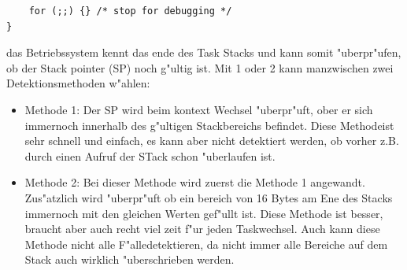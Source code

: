 \documentclass[a4paper, 8pt]{extarticle}
\begin{document}
\begin{multicols*}{3}
\begin{description}
\begin{lstlisting}
	for (;;) {} /* stop for debugging */
}
						\end{lstlisting} 
						das Betriebssystem kennt das ende des Task Stacks und kann somit "uberpr"ufen, ob der Stack pointer (SP) noch g"ultig ist.
						Mit 1 oder 2 kann manzwischen zwei Detektionsmethoden w"ahlen:
						\begin{itemize}
							\item Methode 1:
								  Der SP wird beim kontext Wechsel "uberpr"uft, ober er sich immernoch innerhalb des g"ultigen Stackbereichs befindet. 
								  Diese Methodeist sehr schnell und einfach, es kann aber nicht detektiert werden, ob vorher z.B. durch einen Aufruf der STack schon
								  "uberlaufen ist.
							\item Methode 2:
								  Bei dieser Methode wird zuerst die Methode 1 angewandt. Zus"atzlich wird "uberpr"uft ob ein bereich von 16 Bytes am Ene des Stacks
								  immernoch mit den gleichen Werten gef"ullt ist. Diese Methode ist besser, braucht aber auch recht viel zeit f"ur jeden Taskwechsel. Auch kann
								  diese Methode nicht alle F"alledetektieren, da nicht immer alle Bereiche auf dem Stack auch wirklich "uberschrieben werden. 
						\end{itemize} 
				\end{description}

\end{multicols*}
\end{document}
